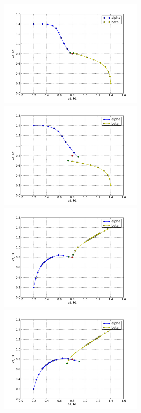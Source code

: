 \begin{figure}
  \begin{center}
    \includegraphics[width=7cm]{chapters/schroll/pdf/4D-1scan1.pdf}
    \includegraphics[width=7cm]{chapters/schroll/pdf/4D-1scan1-5.pdf}
    \includegraphics[width=7cm]{chapters/schroll/pdf/4D-1scan2.pdf}
    \includegraphics[width=7cm]{chapters/schroll/pdf/4D-1scan2-5.pdf}

\end{center}
\end{figure}
